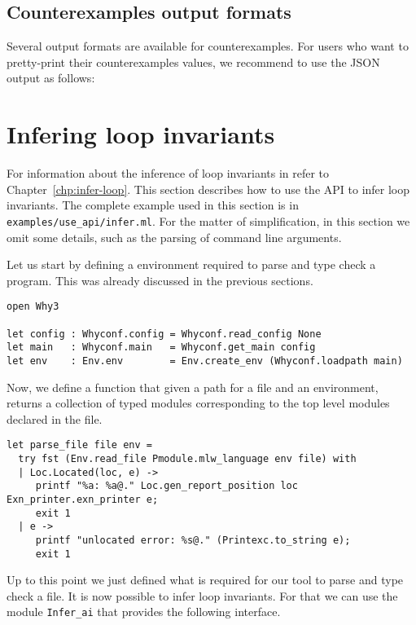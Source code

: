 \subsection{Counterexamples output formats}

Several output formats are available for counterexamples. For users who want to
pretty-print their counterexamples values, we recommend to use the JSON output
as follows:



\section{Infering loop invariants}
\label{sec:infer-loop-api}

For information about the inference of loop invariants in \why refer
to Chapter~\ref{chp:infer-loop}. This section describes how to use the
API to infer loop invariants. The complete example used in this
section is in \verb|examples/use_api/infer.ml|. For the matter of
simplification, in this section we omit some details, such as the
parsing of command line arguments.

Let us start by defining a \why environment required to parse and type
check a \whyml program. This was already discussed in the previous
sections.

\begin{verbatim}
open Why3

let config : Whyconf.config = Whyconf.read_config None
let main   : Whyconf.main   = Whyconf.get_main config
let env    : Env.env        = Env.create_env (Whyconf.loadpath main)
\end{verbatim}

Now, we define a function that given a path for a file and an \why
environment, returns a collection of typed modules corresponding to
the top level modules declared in the file.

\begin{verbatim}
let parse_file file env =
  try fst (Env.read_file Pmodule.mlw_language env file) with
  | Loc.Located(loc, e) ->
     printf "%a: %a@." Loc.gen_report_position loc Exn_printer.exn_printer e;
     exit 1
  | e ->
     printf "unlocated error: %s@." (Printexc.to_string e);
     exit 1
\end{verbatim}

Up to this point we just defined what is required for our tool to
parse and type check a \whyml file. It is now possible to infer loop
invariants. For that we can use the \ocaml module \verb|Infer_ai| that
provides the following interface.

